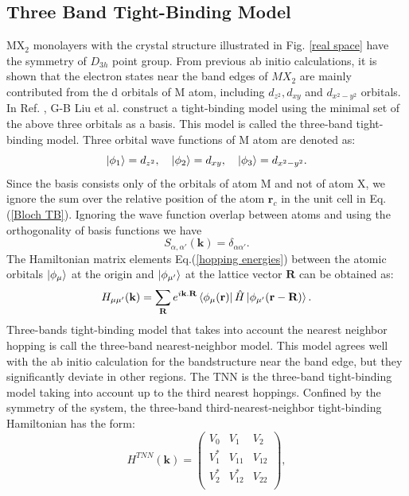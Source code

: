 \documentclass[12pt,english,a4paper]{article}
\begin{document}
	\subsection{Three Band Tight-Binding Model}
\quad $\mathrm{MX}_2$ monolayers with the crystal structure illustrated in Fig. \ref{real space} have the symmetry of $D_{3h}$ point group. From previous ab initio calculations\cite{xiao_coupled_2012,mattheiss_band_1973,lebegue_electronic_2009,zhu_giant_2011,ataca_stable_2012}, it is shown that the electron states near the band edges of $MX_2$ are mainly contributed from the d orbitals of M atom, including $d_{z^2}, d_{xy}$ and $d_{x^2-y^2}$ orbitals. In Ref. \cite{liu_three-band_2013}, G-B Liu et al. construct a tight-binding model using the minimal set of the above three orbitals as a basis. This model is called the three-band tight-binding model. Three orbital wave functions of M atom are denoted as:
	\begin{equation}
		\ket{\phi_{1}} = d_{z^2},\quad \ket{\phi_2} = d_{xy}, \quad \ket{\phi_3} = d_{x^2- y^2}.
	\end{equation}
\quad Since the basis consists only of the orbitals of atom M and not of atom X, we ignore the sum over the relative position of the atom $\textbf{r}_c$ in the unit cell in Eq. (\ref{Bloch TB}). Ignoring the wave function overlap between atoms and using the orthogonality of basis functions we have
$$S_{\alpha, \alpha'}(\textbf{k}) = \delta_{\alpha \alpha'}.$$
\quad The Hamiltonian matrix elements Eq.(\ref{hopping energies}) between the atomic orbitals $\ket{\phi_{\mu}}$ at the origin and $\ket{\phi_{\mu'}}$ at the lattice vector $\textbf{R}$ can be obtained as: $$H_{\mu \mu'}(\textbf{k}) =\sum_{\textbf{R}} e^{i\textbf{k}.\textbf{R}}  \bra{\phi_{\mu}(\textbf{r})}  \hat{H} \ket{\phi_{\mu'}(\textbf{r}-\textbf{R})}.$$
\quad  Three-bands tight-binding model that takes into account the nearest neighbor hopping is call the three-band nearest-neighbor model. This model agrees well with the ab initio calculation for the bandstructure near the band edge, but they significantly deviate in other regions. The \ac{TNN} is the three-band tight-binding model taking into account up to the third nearest hoppings. Confined by the symmetry of the system, the three-band third-nearest-neighbor tight-binding Hamiltonian has the form\cite{liu_three-band_2013}:
	\begin{equation}
		H^{TNN}(\textbf{k}) =
		\begin{pmatrix}
			V_0  & V_1   & V_2 \\
			V_1^*& V_{11}& V_{12} \\
			V_2^*& V_{12}^* & V_{22} \\
		\end{pmatrix},
	\end{equation}
\end{document}
